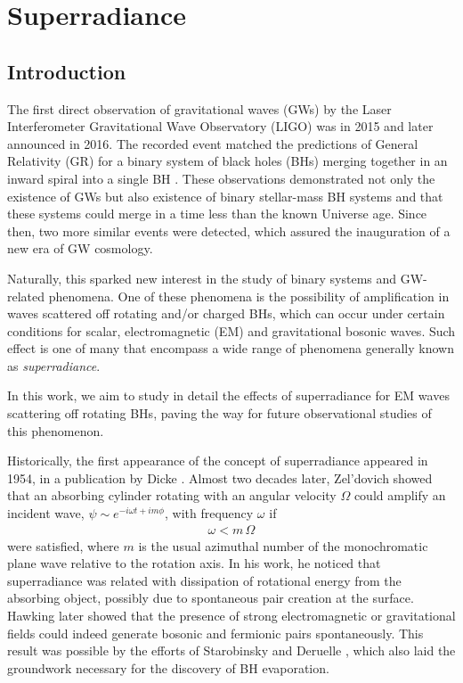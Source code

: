 
\chapter{Superradiance} %
\label{Chapter1}


\section{Introduction}

The first direct observation of gravitational waves (GWs) by the Laser Interferometer Gravitational Wave Observatory (LIGO) was in 2015 and later announced in 2016.
The recorded event matched the predictions of General Relativity (GR) for a binary system of black holes (BHs) merging together in an inward spiral into a single BH \cite{Abbott2016}.
These observations demonstrated not only the existence of GWs but also existence of binary stellar-mass BH systems and that these systems could merge in a time less than the known Universe age.
Since then, two more similar events were detected, which assured the inauguration of a new era of GW cosmology. 

Naturally, this sparked new interest in the study of binary systems and GW-related phenomena.
One of these phenomena is the possibility of amplification in waves scattered off rotating and/or charged BHs, which can occur under certain conditions for scalar, electromagnetic (EM) and gravitational bosonic waves.
Such effect is one of many that encompass a wide range of phenomena generally known as \emph{superradiance}.

In this work, we aim to study in detail the effects of superradiance for EM waves scattering off rotating BHs, paving the way for future observational studies of this phenomenon.

Historically, the first appearance of the concept of superradiance appeared in 1954, in a publication by Dicke \cite{Dicke1954}.
Almost two decades later, Zel'dovich \cite{Zeldovich1971,Zeldovich1972} showed that an absorbing cylinder rotating with an angular velocity $\Omega$ could amplify an incident wave, $\psi \sim e^{-i \omega t + i m \phi}$, with frequency $\omega$ if
\begin{align}
    \omega < m\, \Omega
    \label{eq1:superradiance}
\end{align}
were satisfied, where $m$ is the usual azimuthal number of the monochromatic plane wave relative to the rotation axis.
In his work, he noticed that superradiance was related with dissipation of rotational energy from the absorbing object, possibly due to spontaneous pair creation at the surface. 
Hawking later showed \cite{Hawking1974} that the presence of strong electromagnetic or gravitational fields could indeed generate bosonic and fermionic pairs spontaneously.
This result was possible by the efforts of Starobinsky and Deruelle \cite{Starobinsky1973a,Starobinsky1973b,Deruelle1974,Deruelle1975}, which also laid the groundwork necessary for the discovery of BH evaporation.

